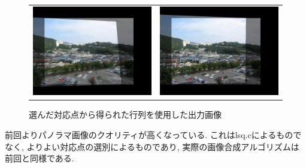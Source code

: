 \documentclass[a4j]{jarticle}
\begin{document}
\begin{figure}[htbp]
\begin{tabular}{cc}
\begin{minipage}{0.5\hsize}
\center
\includegraphics[bb=0 0 1024 768,scale=.2]{../2/panoout.jpg}
\caption{前回の出力画像}
\end{minipage}&
\begin{minipage}{0.5\hsize}
\center
\includegraphics[bb=0 0 1024 768,scale=.2]{out.jpg}
\caption{選んだ対応点から得られた行列を使用した出力画像}
\end{minipage}
\end{tabular}
\end{figure}

前回よりパノラマ画像のクオリティが高くなっている.
これはlsq.cによるものでなく, よりよい対応点の選別によるものであり, 
実際の画像合成アルゴリズムは前回と同様である. 
\end{document}
